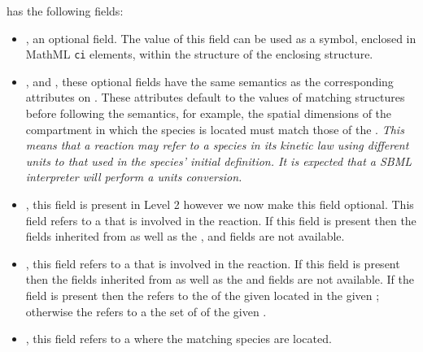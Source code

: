 \documentclass{cekarticle}
\begin{document}
 has the following fields:

\begin{itemize}

\item {}, an optional  field. The value of
this field can be used as a symbol, enclosed in MathML \texttt{ci}
elements, within the  structure of the enclosing
 structure.

\item {},  and
, these optional fields have the
same semantics as the corresponding attributes on .
These attributes default to the values of matching 
structures before following the  semantics, for
example, the spatial dimensions of the compartment in which the
species is located must match those of the
.  \emph{This means that a reaction may
refer to a species in its kinetic law using different units to
that used in the species' initial definition. It is expected that
a SBML interpreter will perform a units conversion.}

\item {}, this  field is present in Level 2 however we now make this field
optional.  This field refers to a  that is involved in the reaction.  If this field is
present then the fields inherited from  as well as the ,
 and  fields are not available.

\item {}, this  field refers to a
 that is involved in the reaction.  If this
field is present then the fields inherited from
 as well as the  and
 fields are not available.  If the
 field is present then the
 refers to the  of
the given  located in the given
; otherwise the 
refers to a the set of  of the given
.

\item {}, this  field refers to a
 where the matching species are located.

\end{itemize}
\end{document}
